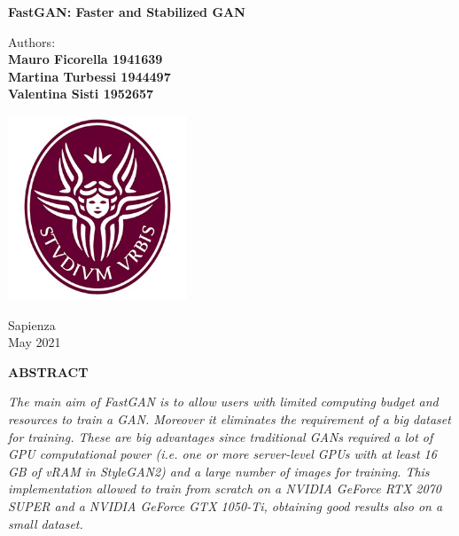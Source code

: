 \documentclass[12pt]{article}
\begin{document}
\begin{titlepage}
	\begin{center}
		\vspace*{1cm}
		
		\Huge
		\textbf{FastGAN: Faster and Stabilized GAN}
		\vspace{1.5cm}
		
		\Large
		Authors:\\
		\textbf{Mauro Ficorella 1941639}\\
		\textbf{Martina Turbessi 1944497}\\
		\textbf{Valentina Sisti 1952657}\\
		\vspace{0.5cm}
		
		\vfill
		
		\includegraphics[width=0.4\textwidth]{Images/Logo.jpg}
		
		\vfill
		
		\vspace{0.8cm}
		
		\Large
		Sapienza\\
		May 2021
	\end{center}
\end{titlepage}


\newpage
\pagestyle{fancy}
\fancyhf{}


\begin{center}
	\normalsize\MakeUppercase{\textbf{Abstract}}

	\begin{minipage}[t]{0.8\textwidth}
	\textit{The main aim of FastGAN is to allow users with limited computing budget and resources to 
	train a GAN. Moreover it eliminates the requirement of a big dataset for training.
	These are big advantages since traditional GANs required a lot of GPU computational power
	(i.e. one or more server-level GPUs with at least 16 GB of vRAM in StyleGAN2) and a large number of 
	images for training. 
	This implementation allowed to train from scratch on a NVIDIA GeForce RTX 2070 SUPER and a 
	NVIDIA GeForce GTX 1050-Ti, obtaining good results also on a small dataset. 
	}
	\end{minipage}

\end{center}
\end{document}
